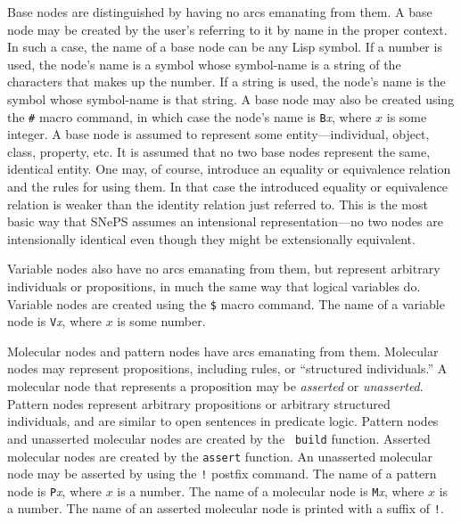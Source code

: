 \documentclass{book}
\makeatletter
\newcommand{\ct}[1]{{\ttfamily #1}} %
\newcommand{\indexct}[1]{\index{#1@\ct{#1}}} %
\makeatother
\begin{document}
Base nodes are distinguished by having no arcs
emanating from them.  A base node may be created by the user's
referring to it by name in the proper context.  In such a case, the
name of a base node can be any Lisp symbol.  If a number is used, the
node's name is a symbol whose symbol-name is a string of the
characters that makes up the number.  If a string is used, the node's
name is the symbol whose symbol-name is that string.  A base node may
also be created using the {\tt \#}\indexct{\#} macro command, in which
case the node's name is {\tt B}{\em x}, where $x$ is some integer.  A
base node is assumed to represent some entity---individual, object,
class, property, etc.  It is assumed that no two base nodes represent
the same, identical entity.  One may, of course, introduce an equality
or equivalence relation and the rules for using them.  In that case
the introduced equality or equivalence relation is weaker than the
identity relation just referred to.  This is the most basic way that
SNePS assumes an intensional representation---no two nodes are
intensionally identical even though they might be extensionally
equivalent.

Variable nodes also have no arcs emanating from
them, but represent arbitrary individuals or propositions, in much the
same way that logical variables do.  Variable nodes are created using
the {\tt \$}\indexct{\$} macro command.  The name of a variable node
is {\tt V}{\em x}, where $x$ is some number.

Molecular nodes and pattern
nodes have arcs emanating from them.  Molecular
nodes may represent propositions, including rules, or ``structured
individuals.''  A molecular node that represents a proposition may be
{\em asserted} or {\em
unasserted}.  Pattern nodes represent
arbitrary propositions or arbitrary structured individuals, and are
similar to open sentences in predicate logic.  Pattern nodes and
unasserted molecular nodes are created by the {\tt
build}\indexct{build} function.  Asserted molecular nodes are created
by the {\tt assert}\indexct{assert} function.  An unasserted molecular
node may be asserted by using the {\tt !}\index{"!@\ct{"!}} postfix
command.  The name of a pattern node is {\tt P}{\em x}, where $x$ is a
number.  The name of a molecular node is {\tt M}{\em x}, where $x$ is
a number.  The name of an asserted molecular node is printed with a
suffix of {\tt !}\index{"!@\ct{"!}}.
\end{document}
